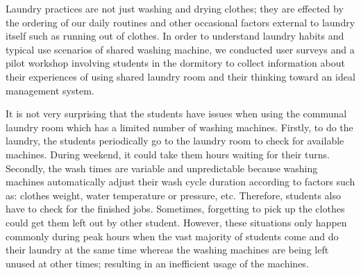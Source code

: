 Laundry practices are not just washing and drying clothes; they are effected by the ordering of
our daily routines \cite{shove2010beyond} and other occasional factors external to laundry itself such as running out of clothes. In order to understand laundry habits and typical use scenarios of shared washing machine, we conducted user surveys and a pilot workshop involving students in the dormitory to collect information about their experiences of using shared laundry room and their thinking toward an ideal management system.

It is not very surprising that the students have issues when using the communal laundry room which has a limited number of washing machines. Firstly, to do the laundry, the students periodically go to the laundry room to check for available machines. During weekend, it could take them hours waiting for their turns. Secondly, the wash times are variable and unpredictable because washing machines automatically adjust their wash cycle duration according to factors such as: clothes weight, water temperature or pressure, etc. Therefore, students also have to check for the finished jobs. Sometimes, forgetting to pick up the clothes could get them left out by other student. However, these situations only happen commonly during peak hours when the vast majority of students come and do their laundry at the same time whereas the washing machines are being left unused at other times; resulting in an inefficient usage of the machines.

